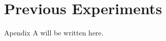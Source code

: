 \appendix
\renewcommand{\thechapter}{A}
\renewcommand{\chaptername}{Appendix}

\chapter{Previous Experiments}

Apendix A will be written here. 
